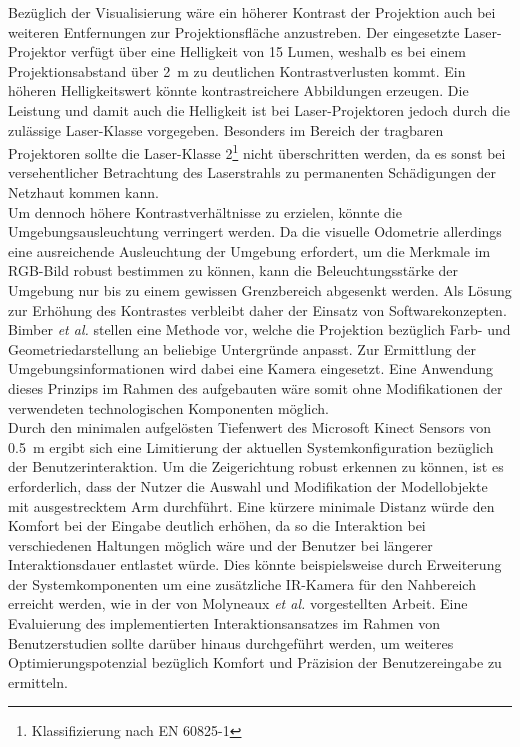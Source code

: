 Bezüglich der Visualisierung wäre ein höherer Kontrast der Projektion auch bei weiteren Entfernungen zur Projektionsfläche anzustreben. Der eingesetzte Laser-Projektor verfügt über eine Helligkeit von 15 Lumen, weshalb es bei einem Projektionsabstand über \SI{2}{\meter} zu deutlichen Kontrastverlusten kommt. Ein höheren Helligkeitswert könnte kontrastreichere Abbildungen erzeugen. Die Leistung und damit auch die Helligkeit ist bei Laser-Projektoren jedoch durch die zulässige Laser-Klasse vorgegeben. Besonders im Bereich der tragbaren Projektoren sollte die Laser-Klasse 2\footnote{Klassifizierung nach EN 60825-1} nicht überschritten werden, da es sonst bei versehentlicher Betrachtung des Laserstrahls zu permanenten Schädigungen der Netzhaut kommen kann.\\

Um dennoch höhere Kontrastverhältnisse zu erzielen, könnte die Umgebungsausleuchtung verringert werden. Da die visuelle Odometrie allerdings eine ausreichende Ausleuchtung der Umgebung erfordert, um die Merkmale im RGB-Bild robust bestimmen zu können, kann die Beleuchtungsstärke der Umgebung nur bis zu einem gewissen Grenzbereich abgesenkt werden. Als Lösung zur Erhöhung des Kontrastes verbleibt daher der Einsatz von Softwarekonzepten. Bimber \textit{et al.} \cite{Bimber2005} stellen eine Methode vor, welche die Projektion bezüglich Farb- und Geometriedarstellung an beliebige Untergründe anpasst. Zur Ermittlung der Umgebungsinformationen wird dabei eine Kamera eingesetzt. Eine Anwendung dieses Prinzips im Rahmen des aufgebauten  wäre somit ohne Modifikationen der verwendeten technologischen Komponenten möglich.\\

Durch den minimalen aufgelösten Tiefenwert des Microsoft Kinect Sensors von \SI{0,5}{\meter} ergibt sich eine Limitierung der aktuellen Systemkonfiguration bezüglich der Benutzerinteraktion. Um die Zeigerichtung robust erkennen zu können, ist es erforderlich, dass der Nutzer die Auswahl und Modifikation der Modellobjekte mit ausgestrecktem Arm durchführt. Eine kürzere minimale Distanz würde den Komfort bei der Eingabe deutlich erhöhen, da so die Interaktion bei verschiedenen Haltungen möglich wäre und der Benutzer bei längerer Interaktionsdauer entlastet würde. Dies könnte beispielsweise durch Erweiterung der Systemkomponenten um eine zusätzliche IR-Kamera für den Nahbereich erreicht werden, wie in der von Molyneaux \textit{et al.} \cite{Molyneaux2012} vorgestellten Arbeit. Eine Evaluierung des implementierten Interaktionsansatzes im Rahmen von Benutzerstudien sollte darüber hinaus durchgeführt werden, um weiteres Optimierungspotenzial bezüglich Komfort und Präzision der Benutzereingabe zu ermitteln.\\

